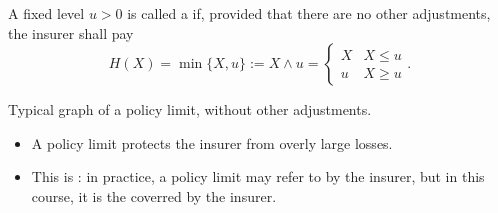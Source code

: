 \documentclass[notoc,notitlepage]{tufte-book}
\begin{document}
\begin{defn}\label{defn:policy_limit}
  A fixed level $u > 0$ is called a  if, provided that there are no other adjustments, the insurer shall pay
  \begin{equation*}
    H(X) = \min \{ X, u \} := X \land u = \begin{cases}
      X & X \leq u \\
      u & X \geq u
    \end{cases}.
  \end{equation*}
  \begin{marginfigure}
    \centering
    \caption{Typical graph of a policy limit, without other adjustments.}\label{fig:typical_graph_of_a_policy_limit_}
  \end{marginfigure}
\end{defn}

\begin{note}
  \begin{itemize}
    \item A policy limit protects the insurer from overly large losses.
    \item This is : in practice, a policy limit may refer to  by the insurer, but in this course, it is the  coverred by the insurer.
  \end{itemize}
\end{note}
\end{document}
